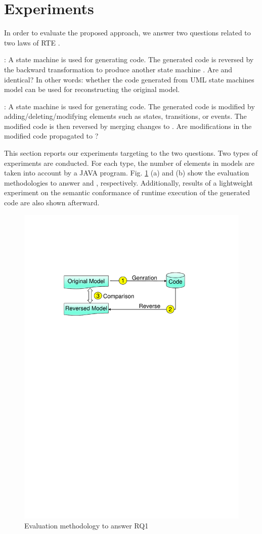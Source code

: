 \section{Experiments}
\label{sec:experiments}
In order to evaluate the proposed approach, we answer two questions related to two laws of RTE \cite{foster_combinators_2007}. 

: A state machine  is used for generating code. The generated code is reversed by the backward transformation to produce another state machine . Are  and  identical? In other words: whether the code generated from UML state machines model can be used for reconstructing the original model.

: A state machine  is used for generating code. The generated code is modified by adding/deleting/modifying elements such as states, transitions, or events. The modified code is then reversed by merging changes to . Are modifications in the modified code propagated to ?

This section reports our experiments targeting to the two questions. Two types of experiments are conducted. For each type, the number of elements in models are taken into account by a JAVA program. Fig. \ref{fig:EvaluationStrategyBoth} (a) and (b) show the evaluation methodologies to answer  and , respectively. Additionally, 
 results of a lightweight experiment on the semantic conformance of runtime execution of the generated code are also shown afterward.

\begin{figure}
\centering
\includegraphics[clip, trim=0.8cm 17.1cm 0.3cm 4.0cm, width=0.8\columnwidth]{figures/EvaluationStrategyBoth}
\caption{Evaluation methodology to answer RQ1} 
\label{fig:EvaluationStrategyBoth}
\end{figure}

